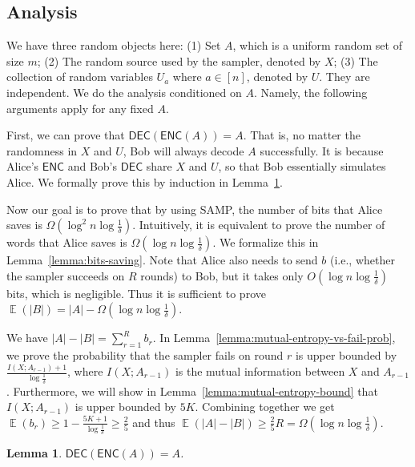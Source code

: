 \documentclass[10pt]{article}
\newtheorem{lemma}{Lemma}
\DeclareMathOperator*{\E}{\mathbb{E}}
\newcommand{\samp}{\textsf{SAMP}\xspace}
\newcommand{\enc}{\textsf{ENC}\xspace}
\newcommand{\dec}{\textsf{DEC}\xspace}
\begin{document}
\subsection{Analysis}

We have three random objects here: (1) Set $A$, which is a uniform random set of size $m$; (2) The random source used by the sampler, denoted by $X$; (3) The collection of random variables $U_a$ where $a\in [n]$, denoted by $U$. They are independent. We do the analysis conditioned on $A$. Namely, the following arguments apply for any fixed $A$. 

First, we can prove that $\dec(\enc(A))=A$. That is, no matter the randomness in $X$ and $U$, Bob will always decode $A$ successfully. It is because Alice's $\enc$ and Bob's $\dec$ share $X$ and $U$, so that Bob essentially simulates Alice. We formally prove this by induction in Lemma~\ref{lemma:zero-fail-prob}. 

Now our goal is to prove that by using \samp, the number of bits that Alice saves is $\Omega(\log^2 n \log\frac{1}{\delta})$. Intuitively, it is equivalent to prove the number of words that Alice saves is $\Omega(\log n \log\frac{1}{\delta})$.
We formalize this in Lemma~\ref{lemma:bits-saving}. Note that Alice also needs to send $b$ (i.e., whether the sampler succeeds on $R$ rounds) to Bob, but it takes only $O(\log n \log\frac{1}{\delta})$ bits, which is negligible. Thus it is sufficient to prove $\E(|B|)=|A|-\Omega(\log n \log\frac{1}{\delta})$. 

We have $|A|-|B|=\sum_{r=1}^{R}b_r$. 
In Lemma~\ref{lemma:mutual-entropy-vs-fail-prob}, we prove the probability that the sampler fails on round $r$ is upper bounded by $\frac{I(X;A_{r-1})+1}{\log \frac{1}{\delta}}$, where $I(X;A_{r-1})$ is the mutual information between $X$ and $A_{r-1}$. 
Furthermore, we will show in Lemma~\ref{lemma:mutual-entropy-bound} that $I(X;A_{r-1})$ is upper bounded by $5K$.
Combining together we get $\E(b_r)\ge 1-\frac{5K+1}{\log \frac{1}{\delta}}\ge \frac{2}{5}$ and thus $\E(|A|-|B|)\ge \frac{2}{5}R=\Omega(\log n \log\frac{1}{\delta})$. 

\begin{lemma}\label{lemma:zero-fail-prob}
  $\dec(\enc(A))=A$.
\end{lemma}
\end{document}
